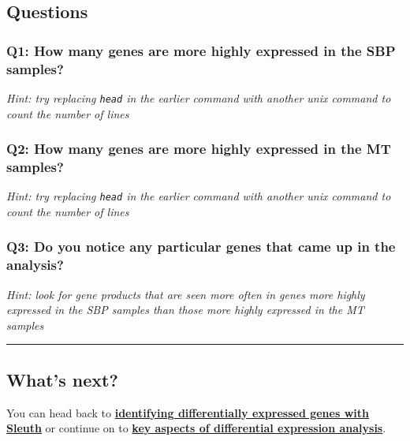 \documentclass[11pt]{article}
\begin{document}
    \hypertarget{questions}{%
\subsection{Questions}\label{questions}}

    \hypertarget{q1-how-many-genes-are-more-highly-expressed-in-the-sbp-samples}{%
\subsubsection{Q1: How many genes are more highly expressed in the SBP
samples?}\label{q1-how-many-genes-are-more-highly-expressed-in-the-sbp-samples}}

\textit{Hint: try replacing \texttt{head} in the earlier command with
another unix command to count the number of lines}

\hypertarget{q2-how-many-genes-are-more-highly-expressed-in-the-mt-samples}{%
\subsubsection{Q2: How many genes are more highly expressed in the MT
samples?}\label{q2-how-many-genes-are-more-highly-expressed-in-the-mt-samples}}

\textit{Hint: try replacing \texttt{head} in the earlier command with
another unix command to count the number of lines}

\hypertarget{q3-do-you-notice-any-particular-genes-that-came-up-in-the-analysis}{%
\subsubsection{Q3: Do you notice any particular genes that came up in
the
analysis?}\label{q3-do-you-notice-any-particular-genes-that-came-up-in-the-analysis}}

\textit{Hint: look for gene products that are seen more often in genes
more highly expressed in the SBP samples than those more highly
expressed in the MT samples}

    \begin{center}\rule{0.5\linewidth}{.4pt}\end{center}

    \hypertarget{whats-next}{%
\subsection{What's next?}\label{whats-next}}

You can head back to \textbf{\href{sleuth-de.ipynb}{identifying
differentially expressed genes with Sleuth}} or continue on to
\textbf{\href{key-aspects.ipynb}{key aspects of differential expression
analysis}}.
\end{document}

